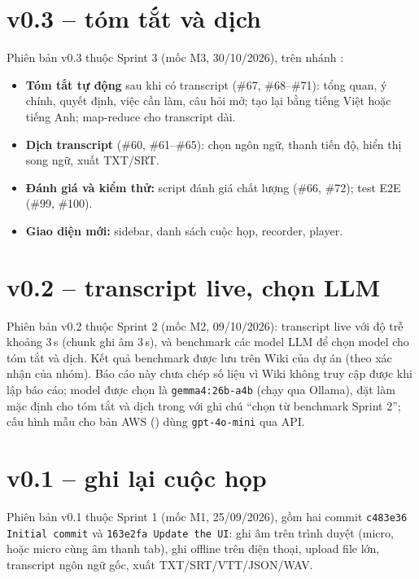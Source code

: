 \documentclass[12pt,a4paper]{report}
\begin{document}
\section{v0.3 -- tóm tắt và dịch}

\begin{sloppypar}
Phiên bản v0.3 thuộc Sprint 3 (mốc M3, 30/10/2026), trên nhánh :
\end{sloppypar}
\begin{itemize}
  \item \textbf{Tóm tắt tự động} sau khi có transcript (\#67, \#68--\#71): tổng quan, ý chính, quyết định, việc cần
        làm, câu hỏi mở; tạo lại bằng tiếng Việt hoặc tiếng Anh; map-reduce cho transcript dài.
  \item \textbf{Dịch transcript} (\#60, \#61--\#65): chọn ngôn ngữ, thanh tiến độ, hiển thị song ngữ, xuất TXT/SRT.
  \item \textbf{Đánh giá và kiểm thử:} script đánh giá chất lượng (\#66, \#72); test E2E (\#99, \#100).
  \item \textbf{Giao diện mới:} sidebar, danh sách cuộc họp, recorder, player.
\end{itemize}

\section{v0.2 -- transcript live, chọn LLM}
\label{sec:v02}

Phiên bản v0.2 thuộc Sprint 2 (mốc M2, 09/10/2026): transcript live với độ trễ khoảng 3\,s (chunk ghi âm 3\,s), và
benchmark các model LLM để chọn model cho tóm tắt và dịch. Kết quả benchmark được lưu trên Wiki của dự án (theo
xác nhận của nhóm). Báo cáo này chưa chép số liệu vì Wiki không truy cập được khi lập báo cáo; model được chọn là \texttt{gemma4:26b-a4b}
(chạy qua Ollama), đặt làm mặc định cho tóm tắt và dịch trong  với ghi chú ``chọn từ benchmark
Sprint 2''; cấu hình mẫu cho bản AWS () dùng \texttt{gpt-4o-mini} qua API.

\section{v0.1 -- ghi lại cuộc họp}

Phiên bản v0.1 thuộc Sprint 1 (mốc M1, 25/09/2026), gồm hai commit \texttt{c483e36 Initial commit} và \texttt{163e2fa Update the UI}:
ghi âm trên trình duyệt (micro, hoặc micro cùng âm thanh tab), ghi offline trên điện thoại, upload file lớn,
transcript ngôn ngữ gốc, xuất TXT/SRT/VTT/JSON/WAV.
\end{document}
